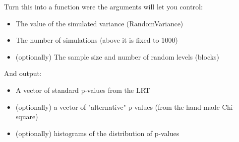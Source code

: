 \documentclass[12pt,a4paper]{scrartcl}\usepackage[]{graphicx}\usepackage[]{color}
\begin{document}
\begin{Exercise}[difficulty=2, title={Turning a piece of code into a function}]
Turn this into a function were the arguments will let you control:
  \begin{itemize}
    \item The value of the simulated variance (RandomVariance)
    \item The number of simulations (above it is fixed to 1000)
    \item (optionally) The sample size and number of random levels (blocks)
  \end{itemize}
And output:
  \begin{itemize}
    \item A vector of standard p-values from the LRT
    \item (optionally) a vector of "alternative" p-values (from the hand-made Chi-square)
    \item (optionally) histograms of the distribution of p-values
  \end{itemize}

\end{Exercise}
\end{document}
